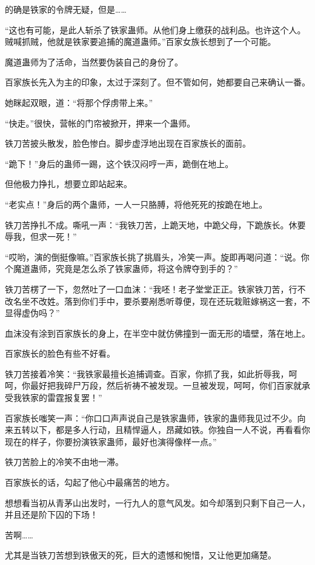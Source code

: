 \begin{this_body}
的确是铁家的令牌无疑，但是……

“这也有可能，是此人斩杀了铁家蛊师。从他们身上缴获的战利品。也许这个人。贼喊抓贼，他就是铁家要追捕的魔道蛊师。”百家女族长想到了一个可能。

魔道蛊师为了活命，当然要伪装自己的身份了。

百家族长先入为主的印象，太过于深刻了。但不管如何，她都要自己来确认一番。

她眯起双眼，道：“将那个俘虏带上来。”

“快走。”很快，营帐的门帘被掀开，押来一个蛊师。

铁刀苦披头散发，脸色惨白。脚步虚浮地出现在百家族长的面前。

“跪下！”身后的蛊师一踢，这个铁汉闷哼一声，跪倒在地上。

但他极力挣扎，想要立即站起来。

“老实点！”身后的两个蛊师，一人一只胳膊，将他死死的按跪在地上。

铁刀苦挣扎不成。嘶吼一声：“我铁刀苦，上跪天地，中跪父母，下跪族长。休要辱我，但求一死！”

“哎哟，演的倒挺像嘛。”百家族长挑了挑眉头，冷笑一声。旋即再喝问道：“说。你个魔道蛊师，究竟是怎么杀了铁家蛊师，将这令牌夺到手的？”

铁刀苦楞了一下，忽然吐了一口血沫：“我呸！老子堂堂正正。铁家铁刀苦，行不改名坐不改姓。落到你们手中，要杀要剐悉听尊便，现在还玩栽赃嫁祸这一套，不显得虚伪吗？”

血沫没有涂到百家族长的身上，在半空中就仿佛撞到一面无形的墙壁，落在地上。

百家族长的脸色有些不好看。

铁刀苦接着冷笑：“我铁家最擅长追捕调查。百家，你抓了我，如此折辱我，呵呵，你最好把我碎尸万段，然后祈祷不被发现。一旦被发现，呵呵，你们百家就承受我铁家的雷霆报复罢！”

百家族长嗤笑一声：“你口口声声说自己是铁家蛊师，铁家的蛊师我见过不少。向来五转以下，都是多人行动，且精悍逼人，昂藏如铁。你独自一人不说，再看看你现在的样子，你要扮演铁家蛊师，最好也演得像样一点。”

铁刀苦脸上的冷笑不由地一滞。

百家族长的话，勾起了他心中最痛苦的地方。

想想看当初从青茅山出发时，一行九人的意气风发。如今却落到只剩下自己一人，并且还是阶下囚的下场！

苦啊……

尤其是当铁刀苦想到铁傲天的死，巨大的遗憾和惋惜，又让他更加痛楚。


\end{this_body}
